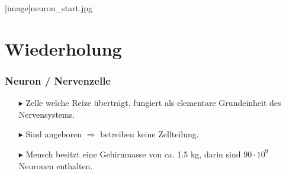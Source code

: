\documentclass[ngerman]{beamer}
\title[Wiederholung Neurobiologie \& Aktionspotenzial]{Wiederholung Neurobiologie\protect\\\mdseries Aktionspotenzial\strut}
\author{Tassilo Tanneberger}
\date{2.11.2020}
\begin{document}
[image]{neuron_start.jpg}
\maketitle
{}




\section{Wiederholung}

\begin{frame}\frametitle{Neuron / Nervenzelle}
\begin{itemize}

\item[$\blacktriangleright$]  Zelle welche Reize überträgt, fungiert als elementare Grundeinheit des Nervensystems.

\item[$\blacktriangleright$]  Sind angeboren $ \Rightarrow $  betreiben keine Zellteilung.

\item[$\blacktriangleright$]  Mensch besitzt eine Gehirnmasse von ca. 1.5 kg, darin sind $ 90 \cdot 10^9 $ Neuronen enthalten.

\end{itemize}
\end{frame}

\end{document}
